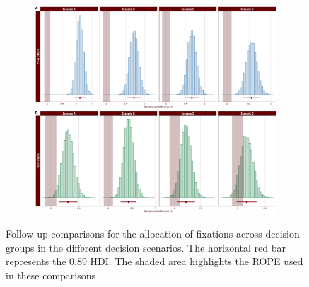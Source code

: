 \begin{appendix}
\begin{figure}[!b]
    \centering
    \begin{subfigure}{1\textwidth}
        \includegraphics[width=\linewidth]{Figures/SD2_proportion_scenario_comparisons_A.png}
        \label{fig:proportion-scenario-comparisons-A}
    \end{subfigure}
    \caption[]{Follow up comparisons for the allocation of fixations across decision groups in the different decision scenarios. The horizontal red bar represents the 0.89 HDI. The shaded area highlights the ROPE used in these comparisons}
\end{figure}

\medskip


\end{appendix}
